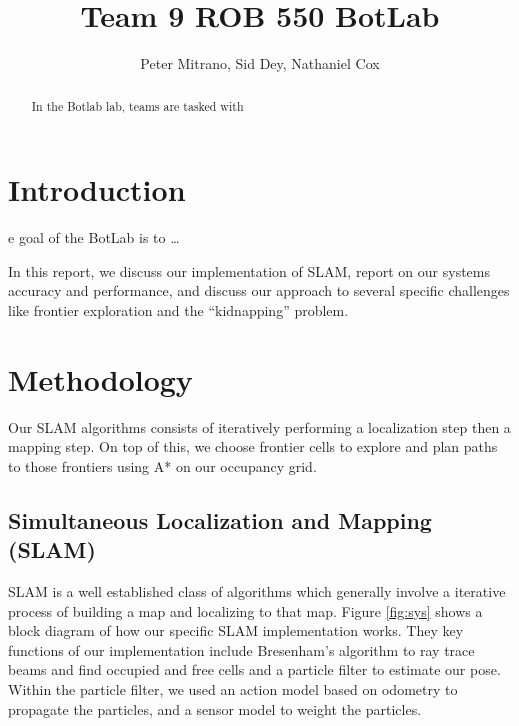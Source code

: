 \documentclass[journal]{IEEEtran}
\begin{document}
\title{Team 9 ROB 550 BotLab}

\author{Peter Mitrano, Sid Dey, Nathaniel Cox}

\maketitle

\begin{abstract}
In the Botlab lab, teams are tasked with
\end{abstract}
\IEEEpeerreviewmaketitle

\section{Introduction}
e goal of the BotLab is to \dots

In this report, we discuss our implementation of SLAM, report on our systems accuracy and performance, and discuss our approach to several specific challenges like frontier exploration and the ``kidnapping'' problem.

\section{Methodology}

    Our SLAM algorithms consists of iteratively performing a localization step then a mapping step. On top of this, we choose frontier cells to explore and plan paths to those frontiers using A* on our occupancy grid.
    
    \subsection{Simultaneous Localization and Mapping (SLAM)}
    
        SLAM is a well established class of algorithms which generally involve a iterative process of building a map and localizing to that map. Figure \ref{fig:sys} shows a block diagram of how our specific SLAM implementation works. They key functions of our implementation include Bresenham's algorithm to ray trace beams and find occupied and free cells and a particle filter to estimate our pose. Within the particle filter, we used an action model based on odometry to propagate the particles, and a sensor model to weight the particles.
        
\end{document}
